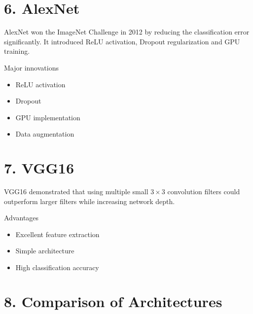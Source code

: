 \documentclass[11pt]{article}
\begin{document}
\section*{6. AlexNet}

AlexNet won the ImageNet Challenge in 2012 by reducing the
classification error significantly. It introduced ReLU activation,
Dropout regularization and GPU training.


Major innovations

\begin{itemize}

\item ReLU activation

\item Dropout

\item GPU implementation

\item Data augmentation

\end{itemize}

\section*{7. VGG16}

VGG16 demonstrated that using multiple small $3\times3$ convolution
filters could outperform larger filters while increasing network depth.


Advantages

\begin{itemize}

\item Excellent feature extraction

\item Simple architecture

\item High classification accuracy

\end{itemize}

\section*{8. Comparison of Architectures}
\end{document}

